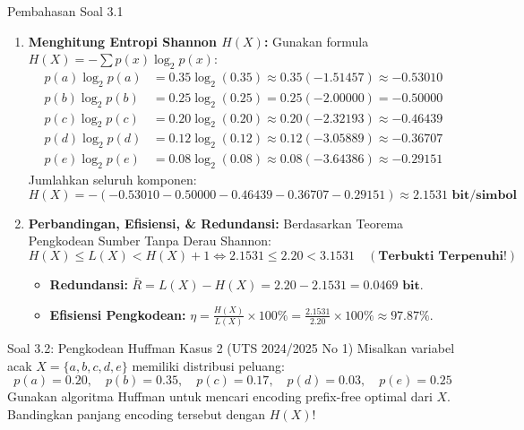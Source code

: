 \documentclass[11pt,a4paper]{article}
\begin{document}
\begin{solusibox}{Pembahasan Soal 3.1}
\begin{enumerate}[leftmargin=*]
    \[
    L(X) = \sum_{x \in X} p(x) \cdot \ell(x) = 0.35(2) + 0.25(2) + 0.20(2) + 0.12(3) + 0.08(3)
    \]
    \[
    L(X) = 0.70 + 0.50 + 0.40 + 0.36 + 0.24 = \mathbf{2.20 \text{ bit/simbol}}
    \]
    \item \textbf{Menghitung Entropi Shannon $H(X)$:}
    Gunakan formula $H(X) = -\sum p(x) \log_2 p(x)$:
    \begin{align*}
    p(a) \log_2 p(a) &= 0.35 \log_2(0.35) \approx 0.35(-1.51457) \approx -0.53010 \\
    p(b) \log_2 p(b) &= 0.25 \log_2(0.25) = 0.25(-2.00000) = -0.50000 \\
    p(c) \log_2 p(c) &= 0.20 \log_2(0.20) \approx 0.20(-2.32193) \approx -0.46439 \\
    p(d) \log_2 p(d) &= 0.12 \log_2(0.12) \approx 0.12(-3.05889) \approx -0.36707 \\
    p(e) \log_2 p(e) &= 0.08 \log_2(0.08) \approx 0.08(-3.64386) \approx -0.29151
    \end{align*}
    Jumlahkan seluruh komponen:
    \[
    H(X) = -(-0.53010 - 0.50000 - 0.46439 - 0.36707 - 0.29151) \approx \mathbf{2.1531 \text{ bit/simbol}}
    \]
    \item \textbf{Perbandingan, Efisiensi, \& Redundansi:}
    Berdasarkan Teorema Pengkodean Sumber Tanpa Derau Shannon:
    \[
    H(X) \le L(X) < H(X) + 1 \iff 2.1531 \le 2.20 < 3.1531 \quad (\textbf{Terbukti Terpenuhi!})
    \]
    \begin{itemize}
        \item \textbf{Redundansi:} $\bar{R} = L(X) - H(X) = 2.20 - 2.1531 = \mathbf{0.0469 \text{ bit}}$.
        \item \textbf{Efisiensi Pengkodean:} $\eta = \frac{H(X)}{L(X)} \times 100\% = \frac{2.1531}{2.20} \times 100\% \approx \mathbf{97.87\%}$.
    \end{itemize}
\end{enumerate}
\end{solusibox}

\vspace{0.4cm}

\begin{soalbox}{Soal 3.2: Pengkodean Huffman Kasus 2 (UTS 2024/2025 No 1)}
Misalkan variabel acak $X = \{a, b, c, d, e\}$ memiliki distribusi peluang:
\[
p(a) = 0.20, \quad p(b) = 0.35, \quad p(c) = 0.17, \quad p(d) = 0.03, \quad p(e) = 0.25
\]
Gunakan algoritma Huffman untuk mencari encoding prefix-free optimal dari $X$. Bandingkan panjang encoding tersebut dengan $H(X)$!
\end{soalbox}
\end{document}
